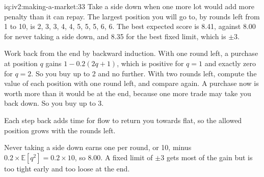 \begin{solution}{iq:iv2:making-a-market:33}
Take a side down when one more lot would add more penalty than it can repay. The largest position you will go to, by rounds left from 1 to 10, is 2, 3, 3, 4, 4, 5, 5, 5, 6, 6. The best expected score is 8.41, against 8.00 for never taking a side down, and 8.35 for the best fixed limit, which is $\pm 3$.

Work back from the end by backward induction. With one round left, a purchase at position $q$ gains $1 - 0.2(2q + 1)$, which is positive for $q = 1$ and exactly zero for $q = 2$. So you buy up to 2 and no further. With two rounds left, compute the value of each position with one round left, and compare again. A purchase now is worth more than it would be at the end, because one more trade may take you back down. So you buy up to 3.

Each step back adds time for flow to return you towards flat, so the allowed position grows with the rounds left.

Never taking a side down earns one per round, or 10, minus $0.2 \times \mathbb{E}[q^2] = 0.2 \times 10$, so 8.00. A fixed limit of $\pm 3$ gets most of the gain but is too tight early and too loose at the end.

\end{solution}

